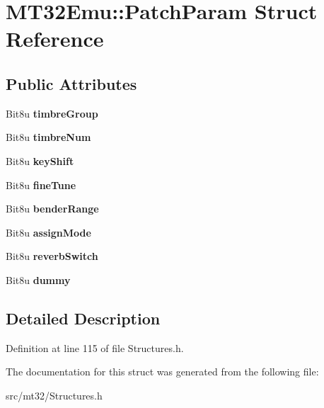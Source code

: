 \hypertarget{structMT32Emu_1_1PatchParam}{\section{M\-T32\-Emu\-:\-:Patch\-Param Struct Reference}
\label{structMT32Emu_1_1PatchParam}
}
\subsection*{Public Attributes}
\begin{DoxyCompactItemize}
\item 
\hypertarget{structMT32Emu_1_1PatchParam_ac6ed7944cc09b397b0cbf537d2b4e2a9}{Bit8u {\bfseries timbre\-Group}}\label{structMT32Emu_1_1PatchParam_ac6ed7944cc09b397b0cbf537d2b4e2a9}

\item 
\hypertarget{structMT32Emu_1_1PatchParam_ae6d7c6a5abe1b2eaac2230a0d9552d85}{Bit8u {\bfseries timbre\-Num}}\label{structMT32Emu_1_1PatchParam_ae6d7c6a5abe1b2eaac2230a0d9552d85}

\item 
\hypertarget{structMT32Emu_1_1PatchParam_ab3ddbc605c9c095add252212268e53b4}{Bit8u {\bfseries key\-Shift}}\label{structMT32Emu_1_1PatchParam_ab3ddbc605c9c095add252212268e53b4}

\item 
\hypertarget{structMT32Emu_1_1PatchParam_a39b67b8ac7532297a794f2dd308a9c80}{Bit8u {\bfseries fine\-Tune}}\label{structMT32Emu_1_1PatchParam_a39b67b8ac7532297a794f2dd308a9c80}

\item 
\hypertarget{structMT32Emu_1_1PatchParam_acff4a10cfdaf676ebcfa8b3be417e9d8}{Bit8u {\bfseries bender\-Range}}\label{structMT32Emu_1_1PatchParam_acff4a10cfdaf676ebcfa8b3be417e9d8}

\item 
\hypertarget{structMT32Emu_1_1PatchParam_afd7d2a011ada4af729eb8a0708fd3ed3}{Bit8u {\bfseries assign\-Mode}}\label{structMT32Emu_1_1PatchParam_afd7d2a011ada4af729eb8a0708fd3ed3}

\item 
\hypertarget{structMT32Emu_1_1PatchParam_a7a3dfa3809a4db2f11f6dcb3e007e21b}{Bit8u {\bfseries reverb\-Switch}}\label{structMT32Emu_1_1PatchParam_a7a3dfa3809a4db2f11f6dcb3e007e21b}

\item 
\hypertarget{structMT32Emu_1_1PatchParam_a7770a5adc3632b698dfb3b180a4d5499}{Bit8u {\bfseries dummy}}\label{structMT32Emu_1_1PatchParam_a7770a5adc3632b698dfb3b180a4d5499}

\end{DoxyCompactItemize}


\subsection{Detailed Description}


Definition at line 115 of file Structures.\-h.



The documentation for this struct was generated from the following file\-:\begin{DoxyCompactItemize}
\item 
src/mt32/Structures.\-h\end{DoxyCompactItemize}
